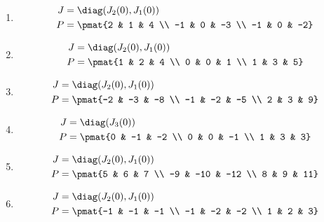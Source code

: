 \begin{enumerate}
\item

\begin{align*}
J &= \diag(J_{2}(0), J_{1}(0))\\
P &= \pmat{2 & 1 & 4 \\ -1 & 0 & -3 \\ -1 & 0 & -2}
\end{align*}

\item

\begin{align*}
J &= \diag(J_{2}(0), J_{1}(0))\\
P &= \pmat{1 & 2 & 4 \\ 0 & 0 & 1 \\ 1 & 3 & 5}
\end{align*}

\item

\begin{align*}
J &= \diag(J_{2}(0), J_{1}(0))\\
P &= \pmat{-2 & -3 & -8 \\ -1 & -2 & -5 \\ 2 & 3 & 9}
\end{align*}

\item

\begin{align*}
J &= \diag(J_{3}(0))\\
P &= \pmat{0 & -1 & -2 \\ 0 & 0 & -1 \\ 1 & 3 & 3}
\end{align*}

\item

\begin{align*}
J &= \diag(J_{2}(0), J_{1}(0))\\
P &= \pmat{5 & 6 & 7 \\ -9 & -10 & -12 \\ 8 & 9 & 11}
\end{align*}

\item

\begin{align*}
J &= \diag(J_{2}(0), J_{1}(0))\\
P &= \pmat{-1 & -1 & -1 \\ -1 & -2 & -2 \\ 1 & 2 & 3}
\end{align*}


\end{enumerate}
